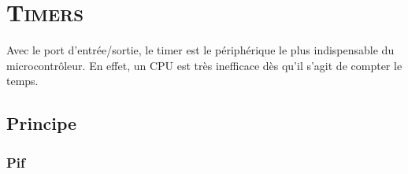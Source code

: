 \chapter{\textsc{Timers}}

Avec le port d'entrée/sortie, le timer est le périphérique le plus indispensable du microcontrôleur. En effet, un CPU est très inefficace dès qu'il s'agit de compter le temps.


\section{Principe}


\subsection{Pif}






